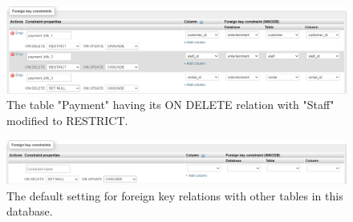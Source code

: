 \documentclass{article}
\begin{document}
		\begin{figure}[H]
			\includegraphics[width=\textwidth]{staff_restrict}
			\caption{The table "Payment" having its ON DELETE relation with "Staff" modified to RESTRICT.}
		\end{figure}
		\begin{figure}[H]
			\includegraphics[width=\textwidth]{setnull_cascade}
			\caption{The default setting for foreign key relations with other tables in this database.}
		\end{figure}
\end{document}
